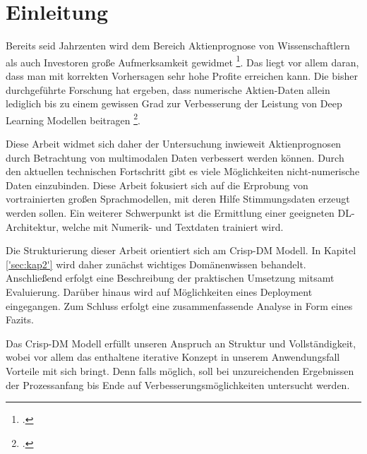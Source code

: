 \section{Einleitung}\label{sec:einleitung}

Bereits seid Jahrzenten wird dem Bereich Aktienprognose von Wissenschaftlern als auch Investoren große Aufmerksamkeit gewidmet \footcite[Kap. Introduction]{zhang2022transformer}. Das liegt vor allem daran, dass man mit korrekten Vorhersagen sehr hohe Profite erreichen kann.
Die bisher durchgeführte Forschung hat ergeben, dass numerische Aktien-Daten allein lediglich bis zu einem gewissen Grad zur Verbesserung der Leistung von Deep Learning Modellen beitragen \footcite[Kap. Introduction]{zhang2022transformer}.

Diese Arbeit widmet sich daher der Untersuchung inwieweit Aktienprognosen durch Betrachtung von multimodalen Daten verbessert werden können. Durch den aktuellen technischen Fortschritt gibt es viele Möglichkeiten nicht-numerische Daten einzubinden. Diese Arbeit fokusiert sich auf die Erprobung von vortrainierten großen Sprachmodellen, mit deren Hilfe Stimmungsdaten erzeugt werden sollen. Ein weiterer Schwerpunkt ist die Ermittlung einer geeigneten DL-Architektur, welche mit Numerik- und Textdaten trainiert wird.

Die Strukturierung dieser Arbeit orientiert sich am Crisp-DM Modell. In Kapitel \ref{'sec:kap2'} wird daher zunächst wichtiges Domänenwissen behandelt. Anschließend erfolgt eine Beschreibung der praktischen Umsetzung mitsamt Evaluierung. Darüber hinaus wird auf Möglichkeiten eines Deployment eingegangen. Zum Schluss erfolgt eine zusammenfassende Analyse in Form eines Fazits. 

Das Crisp-DM Modell erfüllt unseren Anspruch an Struktur und Vollständigkeit, wobei vor allem das enthaltene iterative Konzept in unserem Anwendungsfall Vorteile mit sich bringt. Denn falls möglich, soll bei unzureichenden Ergebnissen der Prozessanfang bis Ende auf Verbesserungsmöglichkeiten untersucht werden.  






